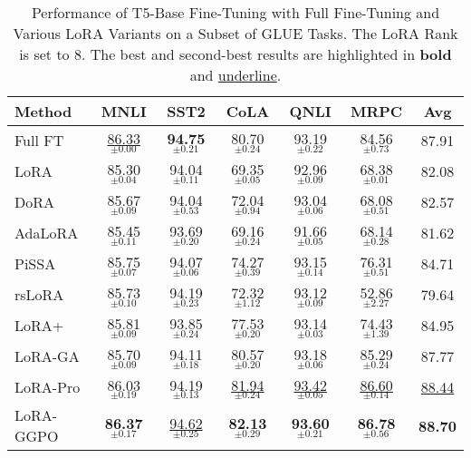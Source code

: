\begin{table*}[htbp]
  \centering
  \caption{Performance of T5-Base Fine-Tuning with Full Fine-Tuning and Various LoRA Variants on a Subset of GLUE Tasks. The LoRA Rank is set to 8. The best and second-best results are highlighted in \textbf{bold} and {\underline{underline}}.}
    \begin{tabular}{l|ccccc|c}
    \toprule
    \textbf{Method} & \textbf{MNLI} & \textbf{SST2} & \textbf{CoLA} & \textbf{QNLI} & \textbf{MRPC} & \textbf{Avg} \\
    \midrule
    Full FT & \underline{86.33$_{\pm0.00}$} & \textbf{94.75$_{\pm0.21}$} & 80.70$_{\pm0.24}$ & 93.19$_{\pm0.22}$ & 84.56$_{\pm0.73}$ & 87.91 \\
    LoRA  & 85.30$_{\pm0.04}$ & 94.04$_{\pm0.11}$ & 69.35$_{\pm0.05}$ & 92.96$_{\pm0.09}$ & 68.38$_{\pm0.01}$ & 82.08 \\
    \midrule
    DoRA  & 85.67$_{\pm0.09}$ & 94.04$_{\pm0.53}$ & 72.04$_{\pm0.94}$ & 93.04$_{\pm0.06}$ & 68.08$_{\pm0.51}$ & 82.57 \\
    AdaLoRA & 85.45$_{\pm0.11}$ & 93.69$_{\pm0.20}$ & 69.16$_{\pm0.24}$ & 91.66$_{\pm0.05}$ & 68.14$_{\pm0.28}$ & 81.62 \\
    \midrule
    PiSSA & 85.75$_{\pm0.07}$ & 94.07$_{\pm0.06}$ & 74.27$_{\pm0.39}$ & 93.15$_{\pm0.14}$ & 76.31$_{\pm0.51}$ & 84.71 \\
    rsLoRA & 85.73$_{\pm0.10}$ & 94.19$_{\pm0.23}$ & 72.32$_{\pm1.12}$ & 93.12$_{\pm0.09}$ & 52.86$_{\pm2.27}$ & 79.64 \\
    LoRA+ & 85.81$_{\pm0.09}$ & 93.85$_{\pm0.24}$ & 77.53$_{\pm0.20}$ & 93.14$_{\pm0.03}$ & 74.43$_{\pm1.39}$ & 84.95 \\
    LoRA-GA & 85.70$_{\pm0.09}$ & 94.11$_{\pm0.18}$ & 80.57$_{\pm0.20}$ & 93.18$_{\pm0.06}$ & 85.29$_{\pm0.24}$ & 87.77 \\
    LoRA-Pro & 86.03$_{\pm0.19}$ & 94.19$_{\pm0.13}$ & \underline{81.94$_{\pm0.24}$} & \underline{93.42$_{\pm0.05}$} & \underline{86.60$_{\pm0.14}$} & \underline{88.44} \\
    \midrule
    LoRA-GGPO & \textbf{86.37$_{\pm0.17}$} & \underline{94.62$_{\pm0.25}$} & \textbf{82.13$_{\pm0.29}$} & \textbf{93.60$_{\pm0.21}$} & \textbf{86.78$_{\pm0.56}$} & \textbf{88.70} \\
    \bottomrule
    \end{tabular}%
  \label{tab:addlabel}%
\end{table*}%
